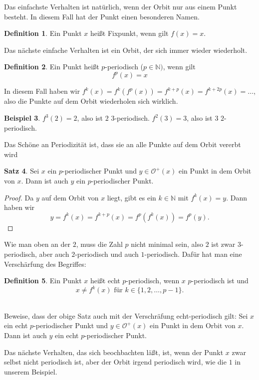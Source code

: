 \documentclass[a4paper,ngerman,12pt]{zirkelblatt1415}
\theoremstyle{definition}
\newtheorem{definition}{Definition}
\newtheorem{satz}[definition]{Satz}
\newtheorem{beispiel}[definition]{Beispiel}
\theoremstyle{remark}
\begin{document}

Das einfachste Verhalten ist natürlich, wenn der Orbit nur aus einem Punkt besteht. In diesem Fall hat der Punkt einen besonderen Namen.
\begin{definition}
Ein Punkt $x$ heißt Fixpunkt, wenn gilt $f(x) =x$.
\end{definition}
Das nächste einfache Verhalten ist ein Orbit, der sich immer wieder wiederholt.
\begin{definition}
Ein Punkt heißt $p$-periodisch ($p\in\mathbb{N})$, wenn gilt
\[ 
f^p(x) =x 
\] 
\end{definition}
In diesem Fall haben wir $f^k(x) = f^k\left(f^p(x)\right) = f^{k+p} (x) = f^{k+2p} (x) = \ldots$, also die Punkte auf dem Orbit wiederholen sich wirklich. 
\begin{beispiel}
$f^{3}(2) = 2$, also ist $2$ $3$-periodisch. $f^2(3) = 3$, also ist $3$ $2$-periodisch. 
\end{beispiel}
Das Schöne an Periodizität ist, dass sie an alle Punkte auf dem Orbit vererbt wird
\begin{satz}
Sei $x$ ein $p$-periodischer Punkt und $y\in\mathcal{O}^+(x)$ ein Punkt in dem Orbit von $x$. Dann ist auch $y$ ein $p$-periodischer Punkt. 
\end{satz}
\begin{proof}
Da $y$ auf dem Orbit von $x$ liegt, gibt es ein $k\in\mathbb{N}$ mit $f^k(x) =y$. Dann haben wir 
\[
 y = f^k(x) = f^{k+p} (x) = f^{p}\left(f^{k}(x) \right) = f^p(y).
\]
\end{proof}
Wie man oben an der $2$, muss die Zahl $p$ nicht minimal sein, also $2$ ist zwar $3$-periodisch, aber auch $2$-periodisch und auch $1$-periodisch. Dafür hat man eine Verschärfung des Begriffes:
\begin{definition}
Ein Punkt $x$ heißt echt $p$-periodisch, wenn $x$ $p$-periodisch ist und 
\[
x\neq f^k(x) \text{ für } k\in\{1,2,\ldots, p-1\}.
\]
\end{definition}
\begin{aufgabe}\\
Beweise, dass der obige Satz auch mit der Verschräfung echt-periodisch gilt:
Sei $x$ ein echt $p$-periodischer Punkt und $y\in\mathcal{O}^+(x)$ ein Punkt in dem Orbit von $x$. Dann ist auch $y$ ein echt $p$-periodischer Punkt. 
\end{aufgabe}
Das nächste Verhalten, das sich beochbachten läßt, ist, wenn der Punkt $x$ zwar selbst nicht periodisch ist, aber der Orbit irgend periodisch wird, wie die $1$ in unserem Beispiel.
\end{document}
